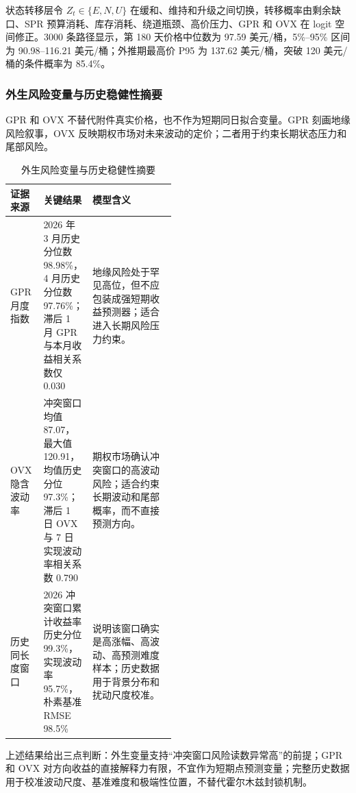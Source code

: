 状态转移层令 \(Z_t\in\{E,N,U\}\) 在缓和、维持和升级之间切换，转移概率由剩余缺口、SPR 预算消耗、库存消耗、绕道瓶颈、高价压力、GPR 和 OVX 在 logit 空间修正。3000 条路径显示，第 180 天价格中位数为 97.59 美元/桶，5\%--95\% 区间为 90.98--116.21 美元/桶；外推期最高价 P95 为 137.62 美元/桶，突破 120 美元/桶的条件概率为 85.4\%。

\subsubsection{外生风险变量与历史稳健性摘要}

GPR 和 OVX 不替代附件真实价格，也不作为短期同日拟合变量。GPR 刻画地缘风险叙事，OVX 反映期权市场对未来波动的定价；二者用于约束长期状态压力和尾部风险。

\begin{table}[H]
\centering
\caption{外生风险变量与历史稳健性摘要}
\begin{tabularx}{\linewidth}{p{0.20\linewidth}p{0.28\linewidth}X}
\toprule
证据来源 & 关键结果 & 模型含义 \\
\midrule
GPR 月度指数 & 2026 年 3 月历史分位数 98.98\%，4 月历史分位数 97.76\%；滞后 1 月 GPR 与本月收益相关系数仅 0.030 & 地缘风险处于罕见高位，但不应包装成强短期收益预测器；适合进入长期风险压力约束。 \\
OVX 隐含波动率 & 冲突窗口均值 87.07，最大值 120.91，均值历史分位 97.3\%；滞后 1 日 OVX 与 7 日实现波动率相关系数 0.790 & 期权市场确认冲突窗口的高波动风险；适合约束长期波动和尾部概率，而不直接预测方向。 \\
历史同长度窗口 & 2026 冲突窗口累计收益率历史分位 99.3\%，实现波动率 95.7\%，朴素基准 RMSE 98.5\% & 说明该窗口确实是高涨幅、高波动、高预测难度样本；历史数据用于背景分布和扰动尺度校准。 \\
\bottomrule
\end{tabularx}
\end{table}

\FloatBarrier

上述结果给出三点判断：外生变量支持“冲突窗口风险读数异常高”的前提；GPR 和 OVX 对方向收益的直接解释力有限，不宜作为短期点预测变量；完整历史数据用于校准波动尺度、基准难度和极端性位置，不替代霍尔木兹封锁机制。
